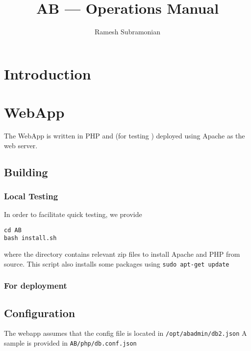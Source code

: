 \documentclass[letterpaper]{article}
\begin{document}
\title{AB --- Operations Manual}
\author{ Ramesh Subramonian }
\maketitle
\thispagestyle{fancy}
\lhead{}
\chead{}
\rhead{}
\cfoot{}
\rfoot{{\small \thepage}}
\section{Introduction}

\section{WebApp}

The WebApp is written in PHP and (for testing ) deployed using Apache 
as the web server. 

\subsection{Building}

\subsubsection{Local Testing}
In order to facilitate quick testing, we provide
\begin{verbatim}
cd AB
bash install.sh 
\end{verbatim}
where the directory contains relevant zip files to install Apache 
and PHP from source.
This script also installs some packages using {\tt sudo apt-get update}

\subsubsection{For deployment}

\subsection{Configuration}

The webapp assumes that the config file is located in
\verb+/opt/abadmin/db2.json+ 
A sample is provided in \verb+AB/php/db.conf.json+
\end{document}
